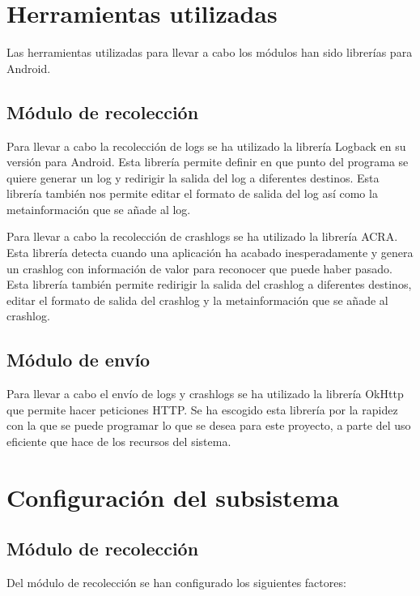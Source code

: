 \section{Herramientas utilizadas}

Las herramientas utilizadas para llevar a cabo los módulos han sido librerías para Android.

\subsection{Módulo de recolección}
Para llevar a cabo la recolección de logs se ha utilizado la librería Logback\cite{Tfg:logbackandroid} en su versión para Android. Esta librería permite definir en que punto del programa se quiere generar un log y redirigir la salida del log a diferentes destinos. Esta librería también nos permite editar el formato de salida del log así como la metainformación que se añade al log.

Para llevar a cabo la recolección de crashlogs se ha utilizado la librería ACRA\cite{Tfg:acra}. Esta librería detecta cuando una aplicación ha acabado inesperadamente y genera un crashlog con información de valor para reconocer que puede haber pasado. Esta librería también permite redirigir la salida del crashlog a diferentes destinos, editar el formato de salida del crashlog y la metainformación que se añade al crashlog.

\subsection{Módulo de envío}
Para llevar a cabo el envío de logs y crashlogs se ha utilizado la librería OkHttp\cite{Tfg:okhttp} que permite hacer peticiones HTTP\cite{Tfg:HTTPv1-1}. Se ha escogido esta librería por la rapidez con la que se puede programar lo que se desea para este proyecto, a parte del uso eficiente que hace de los recursos del sistema.

\section{Configuración del subsistema}

\subsection{Módulo de recolección}


Del módulo de recolección se han configurado los siguientes factores:


